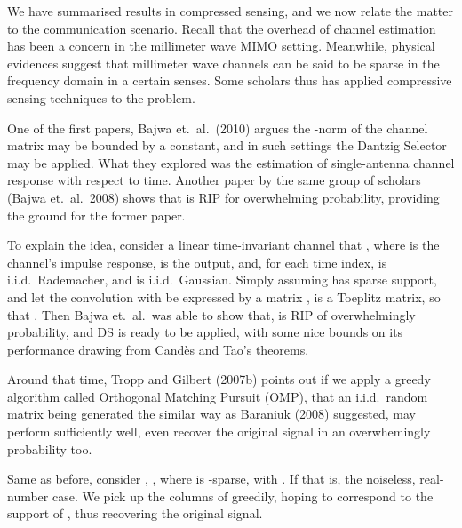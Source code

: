 \stopsection
\startsection [title={Compressed Channel Sensing}]

We have summarised results in compressed sensing, and we now relate the matter to the communication scenario.
Recall that the overhead of channel estimation has been a concern in the millimeter wave MIMO setting.
Meanwhile, physical evidences suggest that millimeter wave channels can be said to be sparse in the frequency domain in a certain senses.
Some scholars thus has applied compressive sensing techniques to the problem.

One of the first papers, Bajwa et.\ al.\ (2010) argues the -norm of the channel matrix may be bounded by a constant, and in such settings the Dantzig Selector may be applied.
What they explored was the estimation of single-antenna channel response with respect to time.
Another paper by the same group of scholars (Bajwa et.\ al.\ 2008) shows that  is RIP for overwhelming probability, providing the ground for the former paper.

To explain the idea, consider a linear time-invariant channel that , where  is the channel's impulse response,  is the output, and, for each time index,  is i.i.d.\ Rademacher, and  is i.i.d.\ Gaussian.
Simply assuming  has sparse support, and let the convolution with  be expressed by a matrix ,  is a Toeplitz matrix, so that .
Then Bajwa et.\ al.\ was able to show that,  is RIP of overwhelmingly probability, and DS is ready to be applied, with some nice bounds on its performance drawing from Cand\`es and Tao's theorems.

\stopsection
\startsection [title={Orthogonal Matching Pursuit}]

Around that time, Tropp and Gilbert (2007b) points out if we apply a greedy algorithm called Orthogonal Matching Pursuit (OMP), that an i.i.d.\ random matrix being generated the similar way as Baraniuk (2008) suggested, may perform sufficiently well, even recover the original signal in an overwhemingly probability too.

Same as before, consider , , where  is -sparse, with .
If
that is, the noiseless, real-number case.
We pick up the columns of  greedily, hoping to correspond to the support of , thus recovering the original signal.

